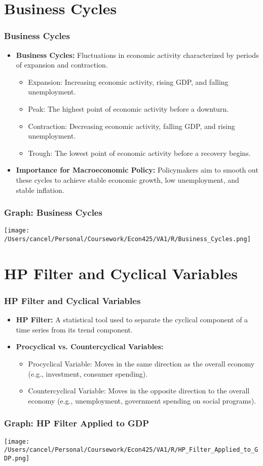\documentclass{beamer}
\begin{document}
\section{Business Cycles}
\begin{frame}
    \frametitle{Business Cycles}
    \begin{itemize}
        \item \textbf{Business Cycles:} Fluctuations in economic activity characterized by periods of expansion and contraction.
        \begin{itemize}
            \item Expansion: Increasing economic activity, rising GDP, and falling unemployment.
            \item Peak: The highest point of economic activity before a downturn.
            \item Contraction: Decreasing economic activity, falling GDP, and rising unemployment.
            \item Trough: The lowest point of economic activity before a recovery begins.
        \end{itemize}
        \item \textbf{Importance for Macroeconomic Policy:} Policymakers aim to smooth out these cycles to achieve stable economic growth, low unemployment, and stable inflation.
    \end{itemize}
\end{frame}

\begin{frame}
    \frametitle{Graph: Business Cycles}
    \begin{center}
        \texttt{[image: /Users/cancel/Personal/Coursework/Econ425/VA1/R/Business\_Cycles.png]}
    \end{center}
\end{frame}

\section{HP Filter and Cyclical Variables}
\begin{frame}
    \frametitle{HP Filter and Cyclical Variables}
    \begin{itemize}
        \item \textbf{HP Filter:} A statistical tool used to separate the cyclical component of a time series from its trend component.
        \item \textbf{Procyclical vs. Countercyclical Variables:}
        \begin{itemize}
            \item Procyclical Variable: Moves in the same direction as the overall economy (e.g., investment, consumer spending).
            \item Countercyclical Variable: Moves in the opposite direction to the overall economy (e.g., unemployment, government spending on social programs).
        \end{itemize}
    \end{itemize}
\end{frame}

\begin{frame}
    \frametitle{Graph: HP Filter Applied to GDP}
    \begin{center}
        \texttt{[image: /Users/cancel/Personal/Coursework/Econ425/VA1/R/HP\_Filter\_Applied\_to\_GDP.png]}
    \end{center}
\end{frame}
\end{document}
